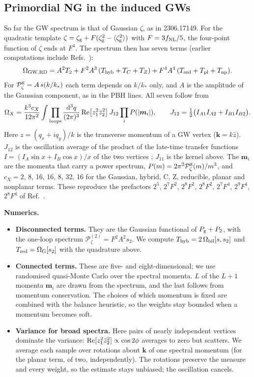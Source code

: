\documentclass[11pt,a4paper]{article}
\newcommand{\zg}{\zeta_{\rm g}}
\newcommand{\dd}{\mathrm{d}}
\newcommand{\fnl}{f_{\rm NL}}
\newcommand{\Pz}{\mathcal{P}_\zeta}
\begin{document}
\subsection{Primordial NG in the induced GWs}\label{sec:ngsigw}

So far the GW spectrum is that of Gaussian $\zeta$, as in 2306.17149. For the quadratic template
$\zeta=\zg+F(\zg^2-\langle\zg^2\rangle)$ with $F=3\fnl/5$, the four-point function of $\zeta$ ends at
$F^4$. The spectrum then has seven terms \cite{ALW21} (earlier computations include
Refs.~\cite{CPS19,Unal19,AD21}):
\begin{equation}
\Omega_{\rm GW,RD}=A^2T_2+F^2A^3\,(T_{\rm hyb}+T_C+T_Z)+F^4A^4\,(T_{\rm red}+T_{\rm pl}+T_{\rm np}).
\end{equation}
For $\Pz^{\rm g}=A\,s(k/k_*)$ each term depends on $k/k_*$ only, and $A$ is the amplitude of the
Gaussian component, as in the PBH lines. All seven follow from
\begin{equation}
\Omega_X=\frac{k^3c_X}{12\pi^2}\int\prod_{\rm loops}\frac{\dd^3q}{(2\pi)^3}\,
{\rm Re}\big[z_1^2\bar z_2^2\big]\,J_{12}\prod_iP(|\bm m_i|),\qquad
J_{12}=\tfrac12\big(I_{A1}I_{A2}+I_{B1}I_{B2}\big).
\end{equation}
Here $z=(q_x+iq_y)/k$ is the transverse momentum of a GW vertex ($\bm k=k\hat z$). $J_{12}$ is the
oscillation average of the product of the late-time transfer functions
$I=(I_A\sin x+I_B\cos x)/x$ of the two vertices \cite{Kohri}; $J_{11}$ is the kernel above. The
$\bm m_i$ are the momenta that carry a power spectrum, $P(m)=2\pi^2\Pz^{\rm g}(m)/m^3$, and $c_X=2$,
8, 16, 16, 8, 32, 16 for the Gaussian, hybrid, C, Z, reducible, planar and nonplanar terms. These
reproduce the prefactors $2^5$, $2^7F^2$, $2^8F^2$, $2^8F^2$, $2^7F^4$, $2^9F^4$, $2^8F^4$ of
Ref.~\cite{ALW21}.

\textbf{Numerics.}
\begin{itemize}
\item \textbf{Disconnected terms.} They are the Gaussian functional of $P_{\rm g}+P_2$, with the
one-loop spectrum $\Pz^{(2)}=F^2A^2s_2$. We compute $T_{\rm hyb}=2\,\Omega_{\rm bil}[s,s_2]$ and
$T_{\rm red}=\Omega_{\rm G}[s_2]$ with the quadrature above.
\item \textbf{Connected terms.} These are five- and eight-dimensional; we use randomised
quasi-Monte Carlo over the spectral momenta. $L$ of the $L+1$ momenta $\bm m_i$ are drawn from
the spectrum, and the last follows from momentum conservation. The choices of which momentum is
fixed are combined with the balance heuristic, so the weights stay bounded when a momentum
becomes soft.
\item \textbf{Variance for broad spectra.} Here pairs of nearly independent vertices dominate the
variance: ${\rm Re}[z_1^2\bar z_2^2]\propto\cos2\phi$ averages to zero but scatters. We average
each sample over rotations about $\bm k$ of one spectral momentum (for the planar term, of two,
independently). The rotations preserve the measure and every weight, so the estimate stays
unbiased; the oscillation cancels.
\end{itemize}
\end{document}
